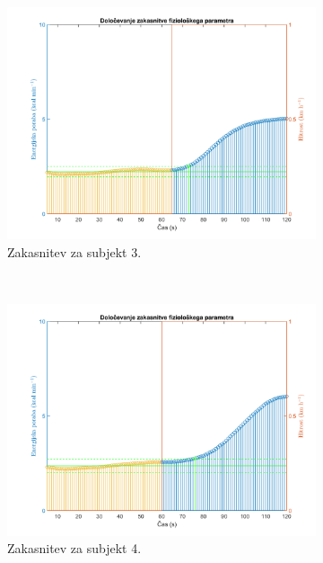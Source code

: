 \begin{figure}[htb]
\begin{subfigure}[t]{0.45\columnwidth}
\includegraphics[width=\columnwidth]{./Slike/lag-estimation-3-eem.png}
\caption{Zakasnitev za subjekt 3.}
\label{fig:lag-estimation-train-eem}
\end{subfigure}
~
\begin{subfigure}[t]{0.45\columnwidth}
\includegraphics[width=\columnwidth]{./Slike/lag-estimation-4-eem.png}
\caption{Zakasnitev za subjekt 4.}
\label{fig:lag-estimation-train-eem}
\end{subfigure}
~
\begin{subfigure}[t]{0.45\columnwidth}

\end{subfigure}
\end{figure}

